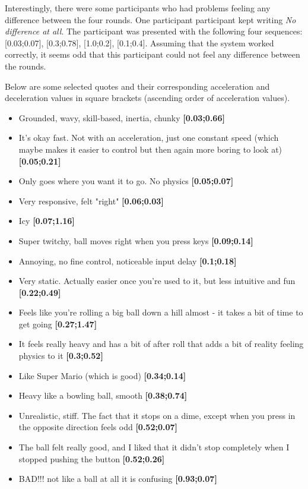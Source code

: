 Interestingly, there were some participants who had problems feeling any difference between the four rounds. One participant participant kept writing \textit{No difference at all}. The participant was presented with the following four sequences: [0.03;0.07], [0.3;0.78], [1.0;0.2], [0.1;0.4]. Assuming that the system worked correctly, it seems odd that this participant could not feel any difference between the rounds.

Below are some selected quotes and their corresponding acceleration and deceleration values in square brackets (ascending order of acceleration values).

\begin{itemize}[noitemsep,nolistsep]
\item Grounded, wavy, skill-based, inertia, chunky \textbf{[0.03;0.66]}
\item It's okay fast. Not with an acceleration, just one constant speed (which maybe makes it easier to control but then again more boring to look at) \textbf{[0.05;0.21]}
\item Only goes where you want it to go. No physics \textbf{[0.05;0.07]}
\item Very responsive, felt "right" \textbf{[0.06;0.03]}
\item Icy \textbf{[0.07;1.16]}
\item Super twitchy, ball moves right when you press keys \textbf{[0.09;0.14]}
\item Annoying, no fine control, noticeable input delay \textbf{[0.1;0.18]}
\item Very static. Actually easier once you're used to it, but less intuitive and fun \textbf{[0.22;0.49]}
\item Feels like you're rolling a big ball down a hill almost - it takes a bit of time to get going \textbf{[0.27;1.47]}
\item It feels really heavy and has a bit of after roll that adds a bit of reality feeling physics to it \textbf{[0.3;0.52]}
\item Like Super Mario (which is good) \textbf{[0.34;0.14]}
\item Heavy like a bowling ball, smooth \textbf{[0.38;0.74]}
\item Unrealistic, stiff. The fact that it stops on a dime, except when you press in the opposite direction feels odd \textbf{[0.52;0.07]}
\item The ball felt really good, and I liked that it didn't stop completely when I stopped pushing the button \textbf{[0.52;0.26]}
\item BAD!!! not like a ball at all it is confusing \textbf{[0.93;0.07]}

\end{itemize}
